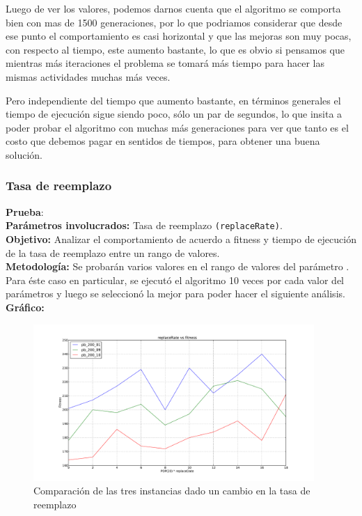 Luego de ver los valores, podemos darnos cuenta que el algoritmo se comporta bien con mas de 1500 generaciones,
por lo que podriamos considerar que desde ese punto el comportamiento es casi horizontal y que las mejoras
son muy pocas, con respecto al tiempo, este aumento bastante, lo que es obvio si pensamos que mientras
más iteraciones el problema se tomará más tiempo para hacer las mismas actividades muchas más veces.

Pero independiente del tiempo que aumento bastante, en términos generales el tiempo de ejecución sigue siendo
poco, sólo un par de segundos, lo que insita a poder probar el algoritmo con muchas más generaciones para
ver que tanto es el costo que debemos pagar en sentidos de tiempos, para obtener una buena solución.



\newpage
\subsubsection{Tasa de reemplazo}

\textbf{Prueba}: \\

\textbf{Parámetros involucrados:} Tasa de reemplazo \texttt{(replaceRate)}.\\

\textbf{Objetivo:} Analizar el comportamiento de acuerdo a fitness y tiempo de ejecución de la tasa de reemplazo entre un rango de valores.\\

\textbf{Metodología:} Se probarán varios valores en el rango de valores del parámetro \blue{[0,1]}.
Para éste caso en particular, se ejecutó el algoritmo 10 veces por cada valor del parámetros y luego se seleccionó la mejor
para poder hacer el siguiente análisis.\\

\textbf{Gráfico:}\\

\begin{figure}[h!]
\begin{center}
	\includegraphics[width=0.95\textwidth]{img/3.pdf}
	\caption{Comparaci\'on de las tres instancias dado un cambio en la tasa de reemplazo}
	\label{fig:3}
\end{center}
\end{figure}

